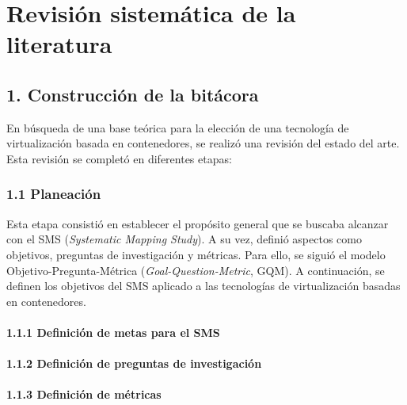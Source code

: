 \chapter*{Revisión sistemática de la literatura}\label{cap:revisionLiteratura}

\section*{1. Construcción de la bitácora}
\label{sec:bitacora}

En búsqueda de una base teórica para la elección de una tecnología de virtualización basada en contenedores, 
se realizó una revisión del estado del arte. Esta revisión se completó en diferentes etapas:

\subsection*{1.1 Planeación}
\label{subsec:planeacion}

Esta etapa consistió en establecer el propósito general que se buscaba alcanzar con el SMS (\textit{Systematic Mapping Study}). 
A su vez, definió aspectos como objetivos, preguntas de investigación y métricas. Para ello, se siguió el modelo 
Objetivo-Pregunta-Métrica (\textit{Goal-Question-Metric}, GQM). A continuación, se definen los objetivos del SMS aplicado 
a las tecnologías de virtualización basadas en contenedores.

\subsubsection*{1.1.1 Definición de metas para el SMS}
\label{subsubsec:metasSMS}



\subsubsection*{1.1.2 Definición de preguntas de investigación}
\label{subsubsec:preguntasInvestigacion}



\subsubsection*{1.1.3 Definición de métricas}
\label{subsubsec:metricasSMS}

